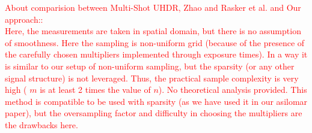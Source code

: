 \textcolor{red}{ About comparision between Multi-Shot UHDR, Zhao and Rasker et al.  and Our approach::\\
	Here, the measurements are taken in spatial domain, but there is no assumption of smoothness. Here the sampling is non-uniform grid (because of the presence of the carefully chosen multipliers implemented through exposure times). In a way it is similar to our setup of non-uniform sampling, but the sparsity  (or any other signal structure) is not leveraged. Thus, the practical sample complexity is very high ( $m$ is at least 2 times the value of $n$). No theoretical analysis provided. This method is compatible to be used with sparsity (as we have used it in our asilomar paper), but the oversampling factor and difficulty in choosing the multipliers are the drawbacks here.}